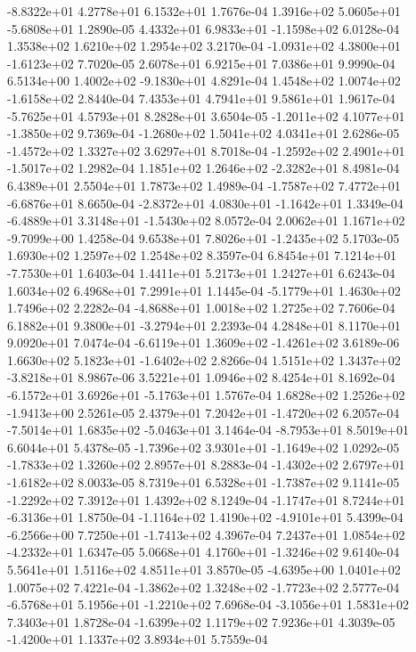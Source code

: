 -8.8322e+01  4.2778e+01  6.1532e+01  1.7676e-04
 1.3916e+02  5.0605e+01 -5.6808e+01  1.2890e-05
 4.4332e+01  6.9833e+01 -1.1598e+02  6.0128e-04
1.3538e+02 1.6210e+02 1.2954e+02  3.2170e-04
-1.0931e+02  4.3800e+01 -1.6123e+02  7.7020e-05
2.6078e+01 6.9215e+01 7.0386e+01  9.9990e-04
 6.5134e+00  1.4002e+02 -9.1830e+01  4.8291e-04
 1.4548e+02  1.0074e+02 -1.6158e+02  2.8440e-04
7.4353e+01 4.7941e+01 9.5861e+01  1.9617e-04
-5.7625e+01  4.5793e+01  8.2828e+01  3.6504e-05
-1.2011e+02  4.1077e+01 -1.3850e+02  9.7369e-04
-1.2680e+02  1.5041e+02  4.0341e+01  2.6286e-05
-1.4572e+02  1.3327e+02  3.6297e+01  8.7018e-04
-1.2592e+02  2.4901e+01 -1.5017e+02  1.2982e-04
 1.1851e+02  1.2646e+02 -2.3282e+01  8.4981e-04
6.4389e+01 2.5504e+01 1.7873e+02  1.4989e-04
-1.7587e+02  7.4772e+01 -6.6876e+01  8.6650e-04
-2.8372e+01  4.0830e+01 -1.1642e+01  1.3349e-04
-6.4889e+01  3.3148e+01 -1.5430e+02  8.0572e-04
 2.0062e+01  1.1671e+02 -9.7099e+00  1.4258e-04
 9.6538e+01  7.8026e+01 -1.2435e+02  5.1703e-05
1.6930e+02 1.2597e+02 1.2548e+02  8.3597e-04
 6.8454e+01  7.1214e+01 -7.7530e+01  1.6403e-04
1.4411e+01 5.2173e+01 1.2427e+01  6.6243e-04
1.6034e+02 6.4968e+01 7.2991e+01  1.1445e-04
-5.1779e+01  1.4630e+02  1.7496e+02  2.2282e-04
-4.8688e+01  1.0018e+02  1.2725e+02  7.7606e-04
 6.1882e+01  9.3800e+01 -3.2794e+01  2.2393e-04
4.2848e+01 8.1170e+01 9.0920e+01  7.0474e-04
-6.6119e+01  1.3609e+02 -1.4261e+02  3.6189e-06
 1.6630e+02  5.1823e+01 -1.6402e+02  2.8266e-04
 1.5151e+02  1.3437e+02 -3.8218e+01  8.9867e-06
3.5221e+01 1.0946e+02 8.4254e+01  8.1692e-04
-6.1572e+01  3.6926e+01 -5.1763e+01  1.5767e-04
 1.6828e+02  1.2526e+02 -1.9413e+00  2.5261e-05
 2.4379e+01  7.2042e+01 -1.4720e+02  6.2057e-04
-7.5014e+01  1.6835e+02 -5.0463e+01  3.1464e-04
-8.7953e+01  8.5019e+01  6.6044e+01  5.4378e-05
-1.7396e+02  3.9301e+01 -1.1649e+02  1.0292e-05
-1.7833e+02  1.3260e+02  2.8957e+01  8.2883e-04
-1.4302e+02  2.6797e+01 -1.6182e+02  8.0033e-05
 8.7319e+01  6.5328e+01 -1.7387e+02  9.1141e-05
-1.2292e+02  7.3912e+01  1.4392e+02  8.1249e-04
-1.1747e+01  8.7244e+01 -6.3136e+01  1.8750e-04
-1.1164e+02  1.4190e+02 -4.9101e+01  5.4399e-04
-6.2566e+00  7.7250e+01 -1.7413e+02  4.3967e-04
 7.2437e+01  1.0854e+02 -4.2332e+01  1.6347e-05
 5.0668e+01  4.1760e+01 -1.3246e+02  9.6140e-04
5.5641e+01 1.5116e+02 4.8511e+01  3.8570e-05
-4.6395e+00  1.0401e+02  1.0075e+02  7.4221e-04
-1.3862e+02  1.3248e+02 -1.7723e+02  2.5777e-04
-6.5768e+01  5.1956e+01 -1.2210e+02  7.6968e-04
-3.1056e+01  1.5831e+02  7.3403e+01  1.8728e-04
-1.6399e+02  1.1179e+02  7.9236e+01  4.3039e-05
-1.4200e+01  1.1337e+02  3.8934e+01  5.7559e-04
